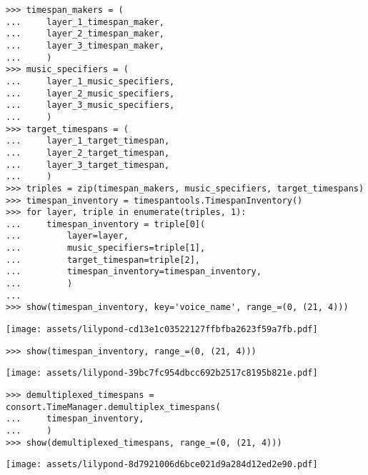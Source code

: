 \begin{singlespacing}
\vspace{-0.5\baselineskip}
\begin{lstlisting}
>>> timespan_makers = (
...     layer_1_timespan_maker,
...     layer_2_timespan_maker,
...     layer_3_timespan_maker,
...     )
>>> music_specifiers = (
...     layer_1_music_specifiers,
...     layer_2_music_specifiers,
...     layer_3_music_specifiers,
...     )
>>> target_timespans = (
...     layer_1_target_timespan,
...     layer_2_target_timespan,
...     layer_3_target_timespan,
...     )
>>> triples = zip(timespan_makers, music_specifiers, target_timespans)
>>> timespan_inventory = timespantools.TimespanInventory()
>>> for layer, triple in enumerate(triples, 1):
...     timespan_inventory = triple[0](
...         layer=layer,
...         music_specifiers=triple[1],
...         target_timespan=triple[2],
...         timespan_inventory=timespan_inventory,
...         )
...
>>> show(timespan_inventory, key='voice_name', range_=(0, (21, 4)))
\end{lstlisting}
\noindent\texttt{[image: assets/lilypond-cd13e1c03522127ffbfba2623f59a7fb.pdf]}
\end{singlespacing}

\begin{comment}
<abjad>
show(timespan_inventory, range_=(0, (21, 4)))
</abjad>
\end{comment}

\begin{singlespacing}
\vspace{-0.5\baselineskip}
\begin{lstlisting}
>>> show(timespan_inventory, range_=(0, (21, 4)))
\end{lstlisting}
\noindent\texttt{[image: assets/lilypond-39bc7fc954dbcc692b2517c8195b821e.pdf]}
\end{singlespacing}

\begin{comment}
<abjad>
demultiplexed_timespans = consort.TimeManager.demultiplex_timespans(
    timespan_inventory,
    )
show(demultiplexed_timespans, range_=(0, (21, 4)))
</abjad>
\end{comment}

\begin{singlespacing}
\vspace{-0.5\baselineskip}
\begin{lstlisting}
>>> demultiplexed_timespans = consort.TimeManager.demultiplex_timespans(
...     timespan_inventory,
...     )
>>> show(demultiplexed_timespans, range_=(0, (21, 4)))
\end{lstlisting}
\noindent\texttt{[image: assets/lilypond-8d7921006d6bce021d9a284d12ed2e90.pdf]}
\end{singlespacing}

